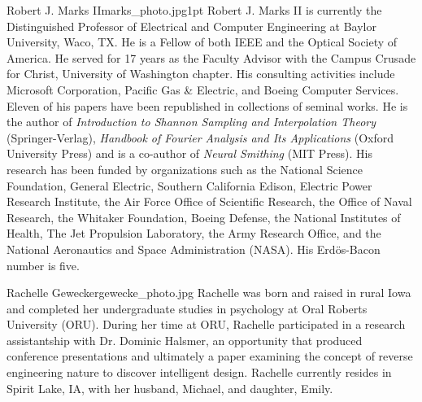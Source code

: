 \begin{authorbio}{Robert J. Marks II}{marks_photo.jpg}{1pt}
Robert J. Marks II is currently the Distinguished Professor of Electrical and Computer Engineering 
at Baylor University, Waco, TX. He is a Fellow of both IEEE and the Optical Society
of America. He served for 17 years as the Faculty Advisor with the Campus Crusade for Christ,
University of Washington chapter. His consulting activities include Microsoft Corporation, Pacific
Gas \& Electric, and Boeing Computer Services. Eleven of his papers have been republished in collections 
of seminal works. He is the author of \textit{Introduction to Shannon Sampling and Interpolation
Theory} (Springer-Verlag), \textit{Handbook of Fourier Analysis and Its Applications} (Oxford University
Press) and is a co-author of \textit{Neural Smithing} (MIT Press). His research has been funded by organizations 
such as the National Science Foundation, General Electric, Southern California Edison,
Electric Power Research Institute, the Air Force Office of Scientific Research, the Office of Naval
Research, the Whitaker Foundation, Boeing Defense, the National Institutes of Health, The Jet
Propulsion Laboratory, the Army Research Office, and the National Aeronautics and Space Administration 
(NASA). 
His Erd\"{o}s-Bacon
number is five.
\end{authorbio}

\begin{authorbio}{Rachelle Gewecke}{rgewecke_photo.jpg}{}
Rachelle was born and raised in rural Iowa and completed her undergraduate studies in psychology at Oral Roberts University (ORU).  During her time at ORU, Rachelle participated in a research assistantship with Dr. Dominic Halsmer, an opportunity that produced conference presentations and ultimately a paper examining the concept of reverse engineering nature to discover intelligent design.  Rachelle currently resides in Spirit Lake, IA, with her husband, Michael, and daughter, Emily.
\end{authorbio}


